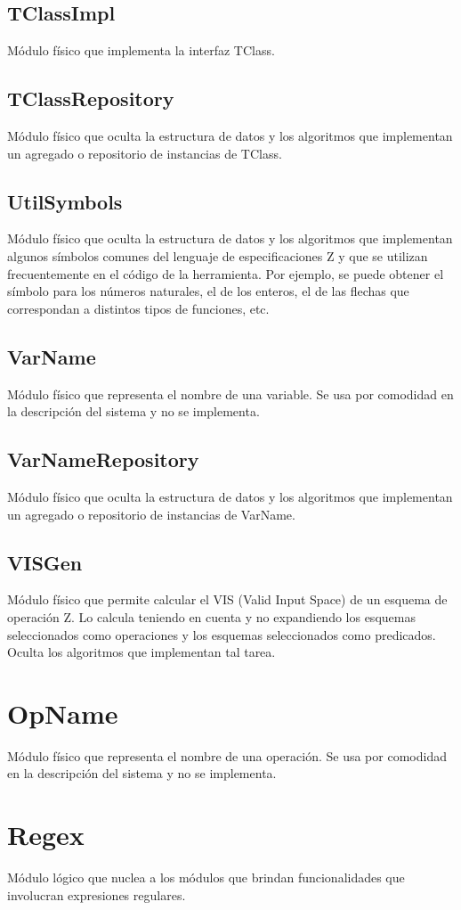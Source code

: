 \documentclass[a4paper,10pt]{report}
\begin{document}
		\subsection{TClassImpl}
		Módulo físico que implementa la interfaz TClass.
		\subsection{TClassRepository}
		Módulo físico que oculta la estructura de datos y los algoritmos que implementan un agregado o repositorio de instancias de TClass.
		\subsection{UtilSymbols}
		Módulo físico que oculta la estructura de datos y los algoritmos que implementan algunos símbolos comunes del lenguaje de especificaciones Z y que se utilizan frecuentemente en el código de la herramienta. Por ejemplo, se puede obtener el símbolo para los números naturales, el de los enteros, el de las flechas que correspondan a distintos tipos de funciones, etc.
		\subsection{VarName}
		Módulo físico que representa el nombre de una variable. Se usa por comodidad en la descripción del sistema y no se implementa.
		\subsection{VarNameRepository}
		Módulo físico que oculta la estructura de datos y los algoritmos que implementan un agregado o repositorio de instancias de VarName.
		\subsection{VISGen}
		Módulo físico que permite calcular el VIS (Valid Input Space) de un esquema de operación Z. Lo calcula teniendo en cuenta y no expandiendo los esquemas seleccionados como operaciones y los esquemas seleccionados como predicados. Oculta los algoritmos que implementan tal tarea.
	\section{OpName}
	Módulo físico que representa el nombre de una operación. Se usa por comodidad en la descripción del sistema y no se implementa.
	\section{Regex}
	Módulo lógico que nuclea a los módulos que brindan funcionalidades que involucran expresiones regulares.
\end{document}
